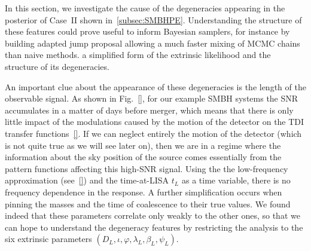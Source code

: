 \documentclass[aps,showpacs,twocolumn,prd,superscriptaddress,nofootinbib]{revtex4-1}
\newcommand\betaL{{\beta_{L}}}
\newcommand\lambdaL{{\lambda_{L}}}
\newcommand\psiL{{\psi_{L}}}
\begin{document}
In this section, we investigate the cause of the degeneracies appearing in the posterior of Case~II shown in~\ref{subsec:SMBHPE}. Understanding the structure of these features could prove useful to inform Bayesian samplers, for instance by building adapted jump proposal allowing a much faster mixing of MCMC chains than naive methods. a simplified form of the extrinsic likelihood and the structure of its degeneracies.

An important clue about the appearance of these degeneracies is the length of the observable signal. As shown in Fig.~\ref{}, for our example SMBH systems the SNR accumulates in a matter of days before merger, which means that there is only little impact of the modulations caused by the motion of the detector on the TDI transfer functions~\eqref{}. If we can neglect entirely the motion of the detector (which is not quite true as we will see later on), then we are in a regime where the information about the sky position of the source comes essentially from the pattern functions affecting this high-SNR signal. Using the the low-frequency approximation (see~\ref{}) and the time-at-LISA $t_{L}$ as a time variable, there is no frequency dependence in the response. A further simplification occurs when pinning the masses and the time of coalescence to their true values. We found indeed that these parameters correlate only weakly to the other ones, so that we can hope to understand the degeneracy features by restricting the analysis to the six extrinsic parameters $(D_{L}, \iota, \varphi, \lambdaL, \betaL, \psiL)$.
\end{document}
